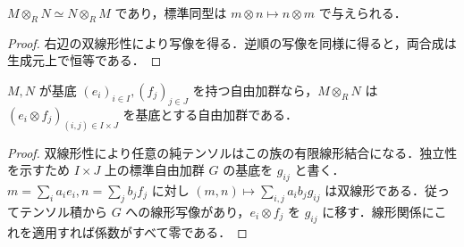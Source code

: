 \begin{prop}[テンソル積の交換同型]
$M\otimes_R N\simeq N\otimes_R M$ であり，標準同型は $m\otimes n\mapsto n\otimes m$ で与えられる．
\end{prop}
\begin{proof}
右辺の双線形性により写像を得る．逆順の写像を同様に得ると，両合成は生成元上で恒等である．
\end{proof}
\begin{prop}[自由加群のテンソル積の基底]
$M,N$ が基底 $(e_i)_{i\in I},(f_j)_{j\in J}$ を持つ自由加群なら，$M\otimes_R N$ は $(e_i\otimes f_j)_{(i,j)\in I\times J}$ を基底とする自由加群である．
\end{prop}
\begin{proof}
双線形性により任意の純テンソルはこの族の有限線形結合になる．独立性を示すため $I\times J$ 上の標準自由加群 $G$ の基底を $g_{ij}$ と書く．$m=\sum_i a_ie_i,n=\sum_j b_jf_j$ に対し $(m,n)\mapsto\sum_{i,j}a_i b_j g_{ij}$ は双線形である．従ってテンソル積から $G$ への線形写像があり，$e_i\otimes f_j$ を $g_{ij}$ に移す．線形関係にこれを適用すれば係数がすべて零である．
\end{proof}
